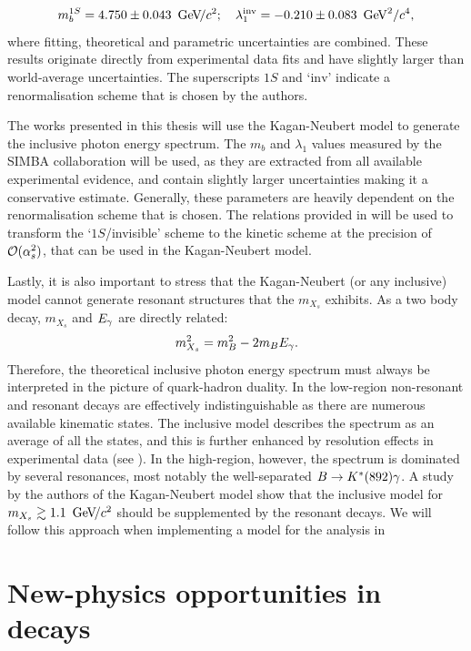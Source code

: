 \begin{equation}\label{eq:simba_result}
    m_b^{1S} =4.750 \pm 0.043~{\mathrm{\,Ge\kern -0.1em V\!/}c^2};  \quad \lambda^{\mathrm{inv}}_1 = -0.210\pm0.083~\mathrm{\,Ge\kern -0.1em V}^2/c^4, 
\end{equation}
where fitting, theoretical and parametric uncertainties are combined.
These results originate directly from experimental data fits and have slightly larger than world-average uncertainties.
The superscripts $1S$ and `$\mathrm{inv}$' indicate a renormalisation scheme that is chosen by the authors.

The works presented in this thesis will use the Kagan-Neubert model to generate the inclusive photon energy spectrum.
The $m_b$ and $\lambda_1$ values measured by the SIMBA collaboration will be used, as they are extracted from all available experimental evidence, and contain slightly larger uncertainties making it a conservative estimate.
Generally, these parameters are heavily dependent on the renormalisation scheme that is chosen.
The relations provided in \cite{Ligeti:2008ac} will be used to transform the `$1S$/invisible' scheme to the kinetic scheme at the precision of ${\cal O}(\alpha_s^2)$, that can be used in the Kagan-Neubert model.

Lastly, it is also important to stress that the Kagan-Neubert (or any inclusive) model cannot generate resonant structures that the $m_{X_s}$ exhibits.
As a two body decay, $m_{X_s}$ and ${E_{\gamma}}$ are directly related:
\begin{equation}
    m_{X_s}^2 = m_B^2 - 2m_B{E_{\gamma}}.
\end{equation}
Therefore, the theoretical inclusive photon energy spectrum must always be interpreted in the picture of quark-hadron duality.
In the low-\Egamma region non-resonant and resonant decays are effectively indistinguishable as there are numerous available kinematic states.
The inclusive model describes the spectrum as an average of all the states, and this is further enhanced by resolution effects in experimental data (see ).
In the high-\Egamma region, however, the spectrum is dominated by several resonances, most notably the well-separated $B\rightarrow K^*(892)\gamma$.
A study by the authors of the Kagan-Neubert model \cite{Kagan:1998ym} show that the inclusive model for $m_{X_s}\gtrsim 1.1~{\mathrm{\,Ge\kern -0.1em V\!/}c^2}$ should be supplemented by the resonant decays.
We will follow this approach when implementing a model for the analysis in 

\section{New-physics opportunities in \safeBtoXsgamma decays}\label{sec:btosgamma_bsm}

